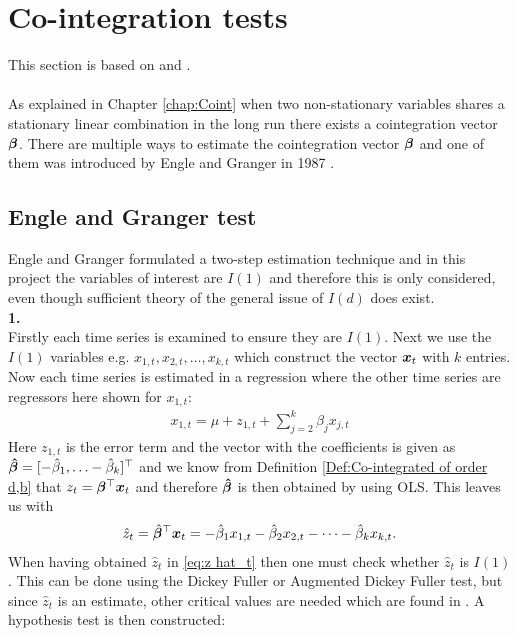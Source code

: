 \chapter{Co-integration tests}
This section is based on \cite{Analysis_of_integrated_and_cointegrated_time_series_with_R} and \cite{Engle_grang_test}.\\\\
\noindent As explained in Chapter \ref{chap:Coint} when two non-stationary variables shares a stationary linear combination in the long run there exists a cointegration vector $\boldsymbol{\beta}$. There are multiple ways to estimate the cointegration vector $\boldsymbol{\beta}$ and one of them was introduced by Engle and Granger in 1987 \cite{co-Integration_and_error_correction}.
\section{Engle and Granger test}
Engle and Granger formulated a two-step estimation technique and in this project the variables of interest are $I(1)$ and therefore this is only considered, even though sufficient theory of the general issue of $I(d)$ does exist. \\
\indent\indent \textbf{1.}\\ 
Firstly each time series is examined to ensure they are $I(1)$. Next we use the $I(1)$ variables e.g. $x_{1,t},x_{2,t},\ldots,x_{k,t}$ which construct the vector $\boldsymbol{x}_t$ with $k$ entries. Now each time series is estimated in a regression where the other time series are regressors here shown for $x_{1,t}$:
\begin{align*}
    x_{1,t}=\mu+z_{1,t}+\sum^k_{j=2}\beta_j x_{j,t}
\end{align*}
Here $z_{1,t}$ is the error term and the vector with the coefficients is given as $\boldsymbol{\hat{\beta}}=[-\hat{\beta}_1,\ldots-\hat{\beta}_k]^\top$ and we know from Definition \ref{Def:Co-integrated of order d,b} that $z_t=\boldsymbol{\beta}^\top \boldsymbol{x}_t$ and therefore $\boldsymbol{\hat{\beta}}$ is then obtained by using OLS. This leaves us with
\begin{align}\label{eq:z hat_t}
\hat{z}_t=\hat{\boldsymbol{\beta}}^\top \boldsymbol{x}_t=-\hat{\beta}_{1}x_{1,t}-\hat{\beta}_{2}x_{2,t}-\cdots-\hat{\beta}_{k}x_{k,t}.
\end{align}
When having obtained $\hat{z}_t$ in \eqref{eq:z hat_t} then one must check whether $\hat{z}_t$ is $I(1)$. This can be done using the Dickey Fuller or Augmented Dickey Fuller test, but since $\hat{z}_t$ is an estimate, other critical values are needed which are found in \cite{ENGLE1987143}. A hypothesis test is then constructed:
